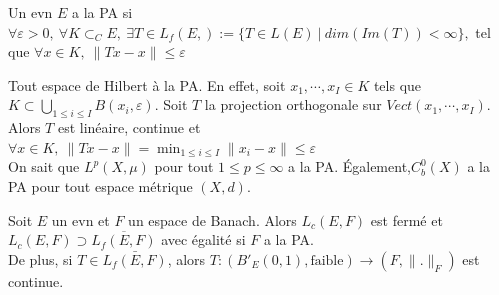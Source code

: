 \begin{definition}
    Un evn $E$ a la PA si\\
    $\forall \varepsilon >0,\ \forall K\subset _CE,\ \exists T\in L_f(E,):=\{T\in L(E)\ |\ dim(Im(T))<\infty \} , $ tel que $\forall x\in K,\ \|Tx-x\|\le \varepsilon  $
\end{definition}
\begin{ex}
    Tout espace de Hilbert à la PA. En effet, soit $x_1,\cdots, x_I\in K$ tels que $K\subset \bigcup\limits_{1\le i\le I}B(x_i,\varepsilon ).$ Soit $T$ la projection orthogonale sur $Vect(x_1,\cdots,x_I).$ Alors $T$ est linéaire, continue et $\forall x\in K,\ \|Tx-x\|=\min_{1\le i\le I}\|x_i-x\|\le \varepsilon  $ \\
    On sait que $L^p(X,\mu)$ pour tout $1\le p\le \infty $ a la PA. \'Egalement,$C^0_b(X)$ a la PA pour tout espace métrique $(X,d).$
\end{ex}
\begin{propriete}
    Soit $E$ un evn et $F$ un espace de Banach. Alors $L_c(E,F)$ est fermé et $L_c(E,F)\supset \overline{L_f(E,F)}$ avec égalité si $F$ a la PA. \\
    De plus, si $T\in \bar{L_f(E,F)}$, alors $T:\left( B'_E(0,1), \text{faible} \right) \to (F,\|.\|_F)$ est continue.
\end{propriete}
